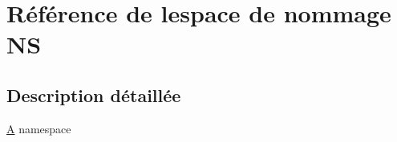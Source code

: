\hypertarget{namespace_n_s}{}\section{Référence de l\textquotesingle{}espace de nommage N\+S}
\label{namespace_n_s}


\subsection{Description détaillée}
\hyperlink{class_a}{A} namespace 